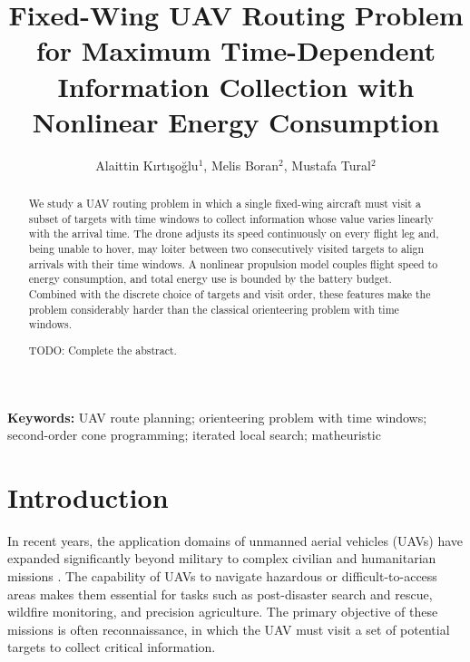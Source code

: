 \documentclass[11pt]{article}
\begin{document}
\title{Fixed-Wing UAV Routing Problem for Maximum Time-Dependent Information Collection with Nonlinear Energy Consumption
}

\author{Alaittin K\i rt\i \c{s}o\u{g}lu$^1$, Melis Boran$^2$, Mustafa Tural$^2$}

\date{}



\maketitle

\begin{abstract}
We study a UAV routing problem in which a single fixed-wing aircraft must visit a subset of targets with time windows to collect information whose value varies linearly with the arrival time. The drone adjusts its speed continuously on every flight leg and, being unable to hover, may loiter between two consecutively visited targets to align arrivals with their time windows. A nonlinear propulsion model couples flight speed to energy consumption, and total energy use is bounded by the battery budget. Combined with the discrete choice of targets and visit order, these features make the problem considerably harder than the classical orienteering problem with time windows.
\vspace{2mm}

\color{red}
TODO: Complete the abstract.
\color{black}
\end{abstract}
\noindent\textbf{Keywords:} UAV route planning; orienteering problem with time windows; second-order cone programming; iterated local search; matheuristic




\section{Introduction}\label{sec:intro}

In recent years, the application domains of unmanned aerial vehicles (UAVs) have expanded significantly beyond military to complex civilian and humanitarian missions \citep{otto2018optimization}. The capability of UAVs to navigate hazardous or difficult-to-access areas makes them essential for tasks such as post-disaster search and rescue, wildfire monitoring, and precision agriculture. The primary objective of these missions is often reconnaissance, in which the UAV must visit a set of potential targets to collect critical information.
\end{document}
